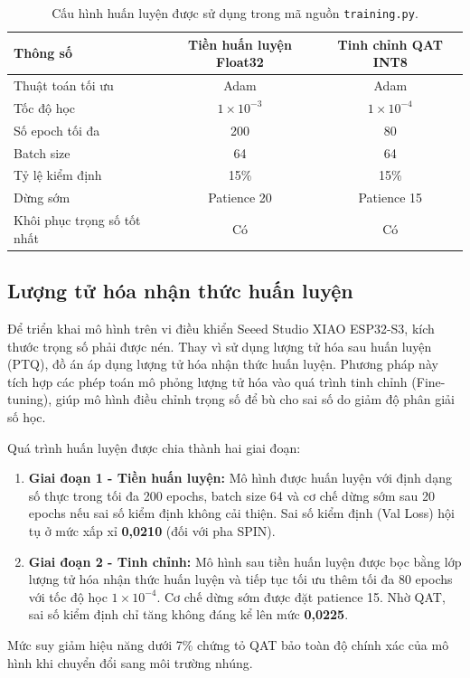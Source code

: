\begin{table}[H]
    \centering
    \caption{Cấu hình huấn luyện được sử dụng trong mã nguồn \texttt{training.py}.}
    \label{tab:training_config}
    \begin{tabular}{lcc}
        \hline
        \textbf{Thông số} & \textbf{Tiền huấn luyện Float32} & \textbf{Tinh chỉnh QAT INT8} \\
        \hline
        Thuật toán tối ưu & Adam & Adam \\
        Tốc độ học & $1\times10^{-3}$ & $1\times10^{-4}$ \\
        Số epoch tối đa & 200 & 80 \\
        Batch size & 64 & 64 \\
        Tỷ lệ kiểm định & 15\% & 15\% \\
        Dừng sớm & Patience 20 & Patience 15 \\
        Khôi phục trọng số tốt nhất & Có & Có \\
        \hline
    \end{tabular}
\end{table}


\subsection{Lượng tử hóa nhận thức huấn luyện}

Để triển khai mô hình trên vi điều khiển Seeed Studio XIAO ESP32-S3, kích thước trọng số phải được nén. Thay vì sử dụng lượng tử hóa sau huấn luyện (PTQ), đồ án áp dụng lượng tử hóa nhận thức huấn luyện. Phương pháp này tích hợp các phép toán mô phỏng lượng tử hóa vào quá trình tinh chỉnh (Fine-tuning), giúp mô hình điều chỉnh trọng số để bù cho sai số do giảm độ phân giải số học.

Quá trình huấn luyện được chia thành hai giai đoạn:
\begin{enumerate}
    \item \textbf{Giai đoạn 1 - Tiền huấn luyện:} Mô hình được huấn luyện với định dạng số thực trong tối đa 200 epochs, batch size 64 và cơ chế dừng sớm sau 20 epochs nếu sai số kiểm định không cải thiện. Sai số kiểm định (Val Loss) hội tụ ở mức xấp xỉ \textbf{0,0210} (đối với pha SPIN).
    \item \textbf{Giai đoạn 2 - Tinh chỉnh:} Mô hình sau tiền huấn luyện được bọc bằng lớp lượng tử hóa nhận thức huấn luyện và tiếp tục tối ưu thêm tối đa 80 epochs với tốc độ học $1\times10^{-4}$. Cơ chế dừng sớm được đặt patience 15. Nhờ QAT, sai số kiểm định chỉ tăng không đáng kể lên mức \textbf{0,0225}.
\end{enumerate}
Mức suy giảm hiệu năng dưới 7\% chứng tỏ QAT bảo toàn độ chính xác của mô hình khi chuyển đổi sang môi trường nhúng.

